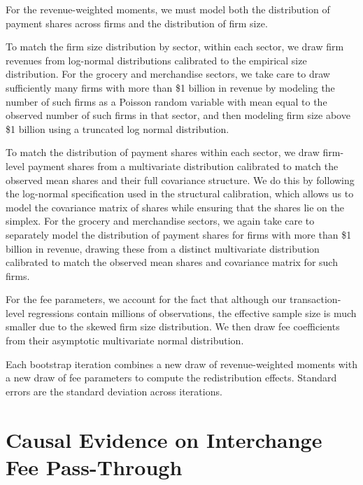 \documentclass[11pt,english]{article}
\theoremstyle{remark}
\begin{document}
For the revenue-weighted moments, we must model both the distribution of payment shares across firms and the distribution of firm size.

To match the firm size distribution by sector, within each sector, we draw firm revenues from log-normal distributions calibrated to the empirical size distribution.
For the grocery and merchandise sectors, we take care to draw sufficiently many firms with more than \$1 billion in revenue by modeling the number of such firms as a Poisson random variable with mean equal to the observed number of such firms in that sector, and then modeling firm size above \$1 billion using a truncated log normal distribution.

To match the distribution of payment shares within each sector, we draw firm-level payment shares from a multivariate distribution calibrated to match the observed mean shares and their full covariance structure.
We do this by following the log-normal specification used in the structural calibration, which allows us to model the covariance matrix of shares while ensuring that the shares lie on the simplex.
For the grocery and merchandise sectors, we again take care to separately model the distribution of payment shares for firms with more than \$1 billion in revenue, drawing these from a distinct multivariate distribution calibrated to match the observed mean shares and covariance matrix for such firms.

For the fee parameters, we account for the fact that although our transaction-level regressions contain millions of observations, the effective sample size is much smaller due to the skewed firm size distribution.
We then draw fee coefficients from their asymptotic multivariate normal distribution.

Each bootstrap iteration combines a new draw of revenue-weighted moments with a new draw of fee parameters to compute the redistribution effects.
Standard errors are the standard deviation across iterations.

\clearpage

\clearpage{}


\section{Causal Evidence on Interchange Fee Pass-Through\label{sec:appendix_durbin}}
\end{document}
